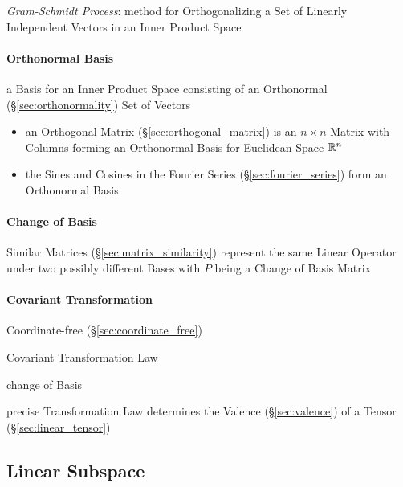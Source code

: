 \emph{Gram-Schmidt Process}: method for Orthogonalizing a Set of Linearly
Independent Vectors in an Inner Product Space



\paragraph{Orthonormal Basis}\label{sec:orthonormal_basis}\hfill

a Basis for an Inner Product Space consisting of an Orthonormal
(\S\ref{sec:orthonormality}) Set of Vectors

\begin{itemize}
  \item an Orthogonal Matrix (\S\ref{sec:orthogonal_matrix}) is an $n \times n$
    Matrix with Columns forming an Orthonormal Basis for Euclidean Space
    $\mathbb{R}^n$
  \item the Sines and Cosines in the Fourier Series
    (\S\ref{sec:fourier_series}) form an Orthonormal Basis
\end{itemize}



\paragraph{Change of Basis}\label{sec:change_of_basis}\hfill

Similar Matrices (\S\ref{sec:matrix_similarity}) represent the same Linear
Operator under two possibly different Bases with $P$ being a Change of Basis
Matrix



\paragraph{Covariant Transformation}\label{sec:covariant_transformation}\hfill

Coordinate-free (\S\ref{sec:coordinate_free})

Covariant Transformation Law

change of Basis

precise Transformation Law determines the Valence
(\S\ref{sec:valence}) of a Tensor (\S\ref{sec:linear_tensor})



\subsection{Linear Subspace}\label{sec:linear_subspace}

